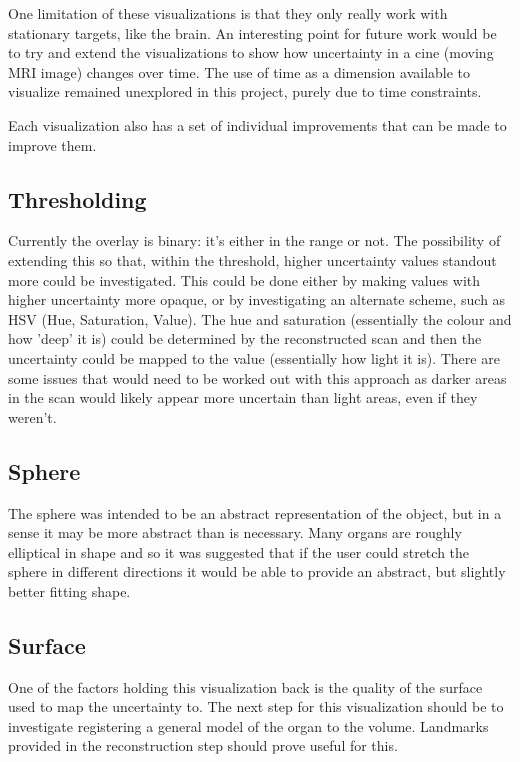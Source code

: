 One limitation of these visualizations is that they only really work with stationary targets, like the brain. An interesting point for future work would be to try and extend the visualizations to show how uncertainty in a cine (moving MRI image) changes over time. The use of time as a dimension available to visualize remained unexplored in this project, purely due to time constraints.

Each visualization also has a set of individual improvements that can be made to improve them.

\subsection*{Thresholding}
Currently the overlay is binary: it's either in the range or not. The possibility of extending this so that, within the threshold, higher uncertainty values standout more could be investigated. This could be done either by making values with higher uncertainty more opaque, or by investigating an alternate scheme, such as HSV (Hue, Saturation, Value). The hue and saturation (essentially the colour and how 'deep' it is) could be determined by the reconstructed scan and then the uncertainty could be mapped to the value (essentially how light it is). There are some issues that would need to be worked out with this approach as darker areas in the scan would likely appear more uncertain than light areas, even if they weren't.

\subsection*{Sphere}
The sphere was intended to be an abstract representation of the object, but in a sense it may be more abstract than is necessary. Many organs are roughly elliptical in shape and so it was suggested that if the user could stretch the sphere in different directions it would be able to provide an abstract, but slightly better fitting shape.

\subsection*{Surface}
One of the factors holding this visualization back is the quality of the surface used to map the uncertainty to. The next step for this visualization should be to investigate registering a general model of the organ to the volume. Landmarks provided in the reconstruction step should prove useful for this.

